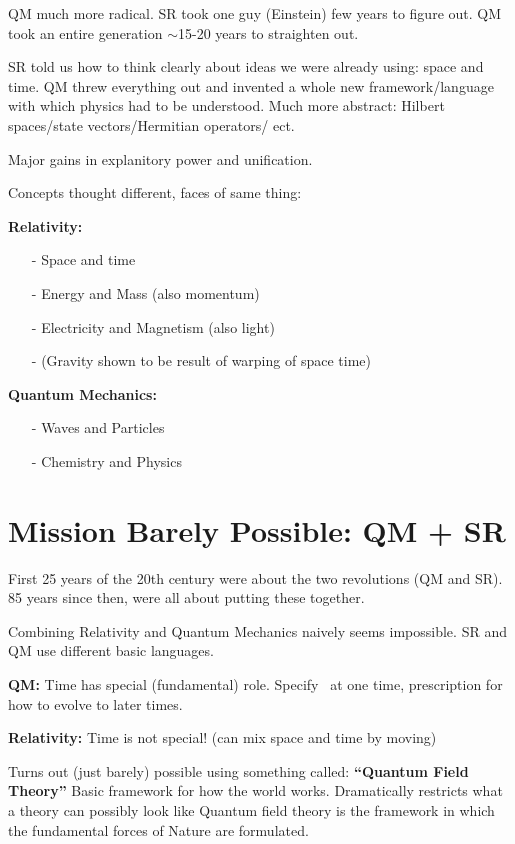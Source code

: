 {QM much more radical. 
SR took one guy (Einstein) few years to figure out. 
QM took an entire generation $\sim$15-20 years to straighten out. 

SR told us how to think clearly about ideas we were already using: space and time. 
QM threw everything out and invented a whole new framework/language with which physics had to be understood.
Much more abstract: Hilbert spaces/state vectors/Hermitian operators/ ect.

Major gains in explanitory power and unification.

Concepts thought different, faces of same thing:

\textbf{Relativity:}
\begin{itemize}
\item[-] Space and time
\item[-] Energy and Mass (also momentum)
\item[-] Electricity and Magnetism (also light)
\item[-] (Gravity shown to be result of warping of space time)
\end{itemize}

\textbf{Quantum Mechanics:}
\begin{itemize}
\item[-] Waves and Particles
\item[-] Chemistry and Physics
\end{itemize}

\section{Mission Barely Possible: QM + SR}
First 25 years of the 20th century were about the two revolutions (QM and SR).
85 years since then, were all about putting these together.

Combining Relativity and Quantum Mechanics naively seems impossible. 
SR and QM use different basic languages. 

\textbf{QM:} Time has special (fundamental) role. Specify \ketY\ at one time, prescription for how to evolve to later times.

\textbf{Relativity:} Time is not special! (can mix space and time by moving)

Turns out (just barely) possible using something called: \textbf{``Quantum Field Theory'' }
Basic framework for how the world works.
Dramatically restricts what a theory can possibly look like
Quantum field theory is the framework in which the fundamental forces of Nature are formulated.

}
